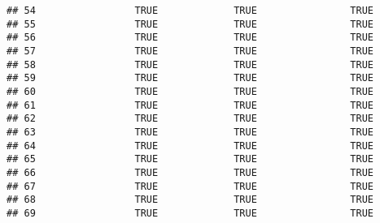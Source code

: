 \documentclass[
]{article}
\begin{document}
\begin{verbatim}
## 54                 TRUE             TRUE                TRUE
## 55                 TRUE             TRUE                TRUE
## 56                 TRUE             TRUE                TRUE
## 57                 TRUE             TRUE                TRUE
## 58                 TRUE             TRUE                TRUE
## 59                 TRUE             TRUE                TRUE
## 60                 TRUE             TRUE                TRUE
## 61                 TRUE             TRUE                TRUE
## 62                 TRUE             TRUE                TRUE
## 63                 TRUE             TRUE                TRUE
## 64                 TRUE             TRUE                TRUE
## 65                 TRUE             TRUE                TRUE
## 66                 TRUE             TRUE                TRUE
## 67                 TRUE             TRUE                TRUE
## 68                 TRUE             TRUE                TRUE
## 69                 TRUE             TRUE                TRUE
\end{verbatim}
\end{document}
